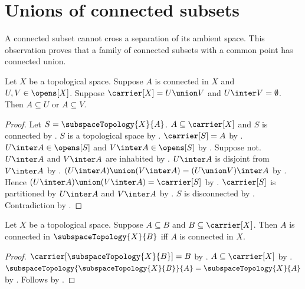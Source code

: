 \section{Unions of connected subsets}



A connected subset cannot cross a separation of its ambient space. This
observation proves that a family of connected subsets with a common point
has connected union.

\begin{theorem}\label{connected_subset_in_separation}
    Let $X$ be a topological space.
    Suppose $A$ is connected in $X$ and $U,V\in\opens[X]$.
    Suppose $\carrier[X]=U\union V$ and $U\inter V=\emptyset$.
    Then $A\subseteq U$ or $A\subseteq V$.
\end{theorem}
\begin{proof}
    Let $S=\subspaceTopology{X}{A}$.
    $A\subseteq\carrier[X]$ and $S$ is connected by .
    $S$ is a topological space by .
    $\carrier[S]=A$ by .
    $U\inter A\in\opens[S]$ and $V\inter A\in\opens[S]$ by
        .
    Suppose not.
    $U\inter A$ and $V\inter A$ are inhabited by .
    $U\inter A$ is disjoint from $V\inter A$ by .
    $(U\inter A)\union(V\inter A)=(U\union V)\inter A$ by
        .
    Hence $(U\inter A)\union(V\inter A)=\carrier[S]$ by
        .
    $\carrier[S]$ is partitioned by $U\inter A$ and $V\inter A$ by
        .
    $S$ is disconnected by .
    Contradiction by .
\end{proof}

\begin{theorem}\label{connected_in_subspace_iff}
    Let $X$ be a topological space.
    Suppose $A\subseteq B$ and $B\subseteq\carrier[X]$.
    Then $A$ is connected in $\subspaceTopology{X}{B}$ iff $A$ is connected in $X$.
\end{theorem}
\begin{proof}
    $\carrier[\subspaceTopology{X}{B}]=B$ by .
    $A\subseteq\carrier[X]$ by .
    $\subspaceTopology{\subspaceTopology{X}{B}}{A}=\subspaceTopology{X}{A}$ by
        .
    Follows by .
\end{proof}

